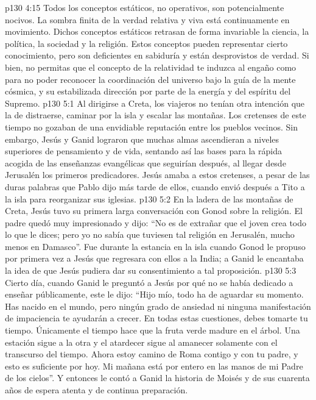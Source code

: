 \vs p130 4:15 Todos los conceptos estáticos, no operativos, son potencialmente nocivos. La sombra finita de la verdad relativa y viva está continuamente en movimiento. Dichos conceptos estáticos retrasan de forma invariable la ciencia, la política, la sociedad y la religión. Estos conceptos pueden representar cierto conocimiento, pero son deficientes en sabiduría y están desprovistos de verdad. Si bien, no permitas que el concepto de la relatividad te induzca al engaño como para no poder reconocer la coordinación del universo bajo la guía de la mente cósmica, y su estabilizada dirección por parte de la energía y del espíritu del Supremo.
\vs p130 5:1 Al dirigirse a Creta, los viajeros no tenían otra intención que la de distraerse, caminar por la isla y escalar las montañas. Los cretenses de este tiempo no gozaban de una envidiable reputación entre los pueblos vecinos. Sin embargo, Jesús y Ganid lograron que muchas almas ascendieran a niveles superiores de pensamiento y de vida, sentando así las bases para la rápida acogida de las enseñanzas evangélicas que seguirían después, al llegar desde Jerusalén los primeros predicadores. Jesús amaba a estos cretenses, a pesar de las duras palabras que Pablo dijo más tarde de ellos, cuando envió después a Tito a la isla para reorganizar sus iglesias.
\vs p130 5:2 En la ladera de las montañas de Creta, Jesús tuvo su primera larga conversación con Gonod sobre la religión. El padre quedó muy impresionado y dijo: “No es de extrañar que el joven crea todo lo que le dices; pero yo no sabía que tuviesen tal religión en Jerusalén, mucho menos en Damasco”. Fue durante la estancia en la isla cuando Gonod le propuso por primera vez a Jesús que regresara con ellos a la India; a Ganid le encantaba la idea de que Jesús pudiera dar su consentimiento a tal proposición.
\vs p130 5:3 Cierto día, cuando Ganid le preguntó a Jesús por qué no se había dedicado a enseñar públicamente, este le dijo: “Hijo mío, todo ha de aguardar su momento. Has nacido en el mundo, pero ningún grado de ansiedad ni ninguna manifestación de impaciencia te ayudarán a crecer. En todas estas cuestiones, debes tomarte tu tiempo. Únicamente el tiempo hace que la fruta verde madure en el árbol. Una estación sigue a la otra y el atardecer sigue al amanecer solamente con el transcurso del tiempo. Ahora estoy camino de Roma contigo y con tu padre, y esto es suficiente por hoy. Mi mañana está por entero en las manos de mi Padre de los cielos”. Y entonces le contó a Ganid la historia de Moisés y de sus cuarenta años de espera atenta y de continua preparación.
